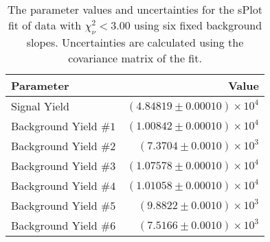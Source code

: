 
\begin{table}[ht]
    \begin{center}
        \begin{tabular}{lr}\toprule
            Parameter & Value \\\midrule
            Signal Yield & $(4.84819 \pm 0.00010) \times 10^{4}$ \\
            Background Yield $\#1$ & $(1.00842 \pm 0.00010) \times 10^{4}$ \\
            Background Yield $\#2$ & $(7.3704 \pm 0.0010) \times 10^{3}$ \\
            Background Yield $\#3$ & $(1.07578 \pm 0.00010) \times 10^{4}$ \\
            Background Yield $\#4$ & $(1.01058 \pm 0.00010) \times 10^{4}$ \\
            Background Yield $\#5$ & $(9.8822 \pm 0.0010) \times 10^{3}$ \\
            Background Yield $\#6$ & $(7.5166 \pm 0.0010) \times 10^{3}$ \\\bottomrule
        \end{tabular}
        \caption{The parameter values and uncertainties for the sPlot fit of data with $\chi^2_\nu < 3.00$ using six fixed background slopes. Uncertainties are calculated using the covariance matrix of the fit.}\label{tab:splot-fit-results-chisqdof-3.00-fixed-6}
    \end{center}
\end{table}
